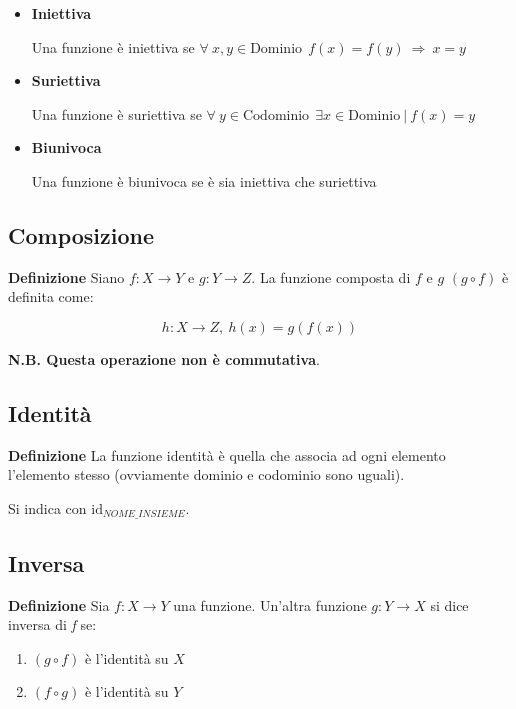 \documentclass{article}
\begin{document}
\begin{itemize}
    \item \textbf{Iniettiva}

    Una funzione è iniettiva se $\forall \ x,y\in \text{Dominio}\ \ \textit{f}(x) = \textit{f}(y) \ \Rightarrow\ x=y$

    \item \textbf{Suriettiva}

    Una funzione è suriettiva se $\forall \ y\in \text{Codominio}\ \ \exists x\in \text{Dominio}\ |\ \textit{f}(x) = y$

    \item \textbf{Biunivoca}

    Una funzione è biunivoca se è sia iniettiva che suriettiva
    
\end{itemize}

\subsection{Composizione}

\textbf{Definizione} Siano $f:X\rightarrow Y$ e $g:Y\rightarrow Z$. La funzione composta di $f$ e $g$ $(g\circ f)$ è definita come:

$$h:X\rightarrow Z,\ h(x)=g(f(x))$$\newline

\noindent\textbf{N.B. Questa operazione non è commutativa}.

\subsection{Identità}

\textbf{Definizione} La funzione identità è quella che associa ad ogni elemento l'elemento stesso (ovviamente dominio e codominio sono uguali).\newline

\noindent Si indica con $\text{id}_{NOME\_INSIEME}$.

\subsection{Inversa}

\textbf{Definizione} Sia $\textit{f} :X\rightarrow Y$ una funzione. Un'altra funzione $\textit{g}:Y\rightarrow X$ si dice inversa di \textit{f} se:
\begin{enumerate}
    \item $(\textit{g}\circ \textit{f})$ è l'identità su $X$
    \item $(\textit{f}\circ \textit{g})$ è l'identità su $Y$\newline
\end{enumerate}
\end{document}
